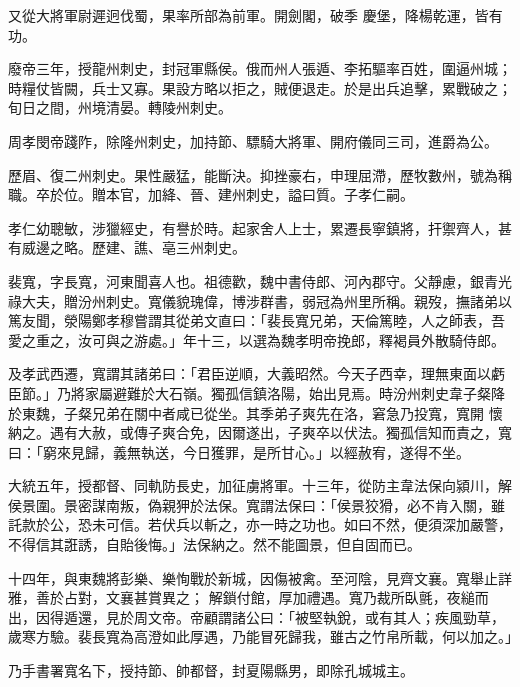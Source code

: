 \begin{pinyinscope}
 又從大將軍尉遲迥伐蜀，果率所部為前軍。開劍閣，破季
 慶堡，降楊乾運，皆有功。



 廢帝三年，授龍州刺史，封冠軍縣侯。俄而州人張遁、李拓驅率百姓，圍逼州城；時糧仗皆闕，兵士又寡。果設方略以拒之，賊便退走。於是出兵追擊，累戰破之；旬日之間，州境清晏。轉陵州刺史。



 周孝閔帝踐阼，除隆州刺史，加持節、驃騎大將軍、開府儀同三司，進爵為公。



 歷眉、復二州刺史。果性嚴猛，能斷決。抑挫豪右，申理屈滯，歷牧數州，號為稱職。卒於位。贈本官，加絳、晉、建州刺史，謚曰質。子孝仁嗣。



 孝仁幼聰敏，涉獵經史，有譽於時。起家舍人上士，累遷長寧鎮將，扞禦齊人，甚有威邊之略。歷建、譙、亳三州刺史。



 裴寬，字長寬，河東聞喜人也。祖德歡，魏中書侍郎、河內郡守。父靜慮，銀青光祿大夫，贈汾州刺史。寬儀貌瑰偉，博涉群書，弱冠為州里所稱。親歿，撫諸弟以篤友聞，滎陽鄭孝穆嘗謂其從弟文直曰：「裴長寬兄弟，天倫篤睦，人之師表，吾愛之重之，汝可與之游處。」年十三，以選為魏孝明帝挽郎，釋褐員外散騎侍郎。



 及孝武西遷，寬謂其諸弟曰：「君臣逆順，大義昭然。今天子西幸，理無東面以虧臣節。」乃將家屬避難於大石嶺。獨孤信鎮洛陽，始出見焉。時汾州刺史韋子粲降於東魏，子粲兄弟在關中者咸已從坐。其季弟子爽先在洛，窘急乃投寬，寬開
 懷納之。遇有大赦，或傳子爽合免，因爾遂出，子爽卒以伏法。獨孤信知而責之，寬曰：「窮來見歸，義無執送，今日獲罪，是所甘心。」以經赦宥，遂得不坐。



 大統五年，授都督、同軌防長史，加征虜將軍。十三年，從防主韋法保向潁川，解侯景圍。景密謀南叛，偽親狎於法保。寬謂法保曰：「侯景狡猾，必不肯入關，雖託款於公，恐未可信。若伏兵以斬之，亦一時之功也。如曰不然，便須深加嚴警，不得信其誑誘，自貽後悔。」法保納之。然不能圖景，但自固而已。



 十四年，與東魏將彭樂、樂恂戰於新城，因傷被禽。至河陰，見齊文襄。寬舉止詳雅，善於占對，文襄甚賞異之；
 解鎖付館，厚加禮遇。寬乃裁所臥氈，夜縋而出，因得遁還，見於周文帝。帝顧謂諸公曰：「被堅執銳，或有其人；疾風勁草，歲寒方驗。裴長寬為高澄如此厚遇，乃能冒死歸我，雖古之竹帛所載，何以加之。」



 乃手書署寬名下，授持節、帥都督，封夏陽縣男，即除孔城城主。




\end{pinyinscope}
